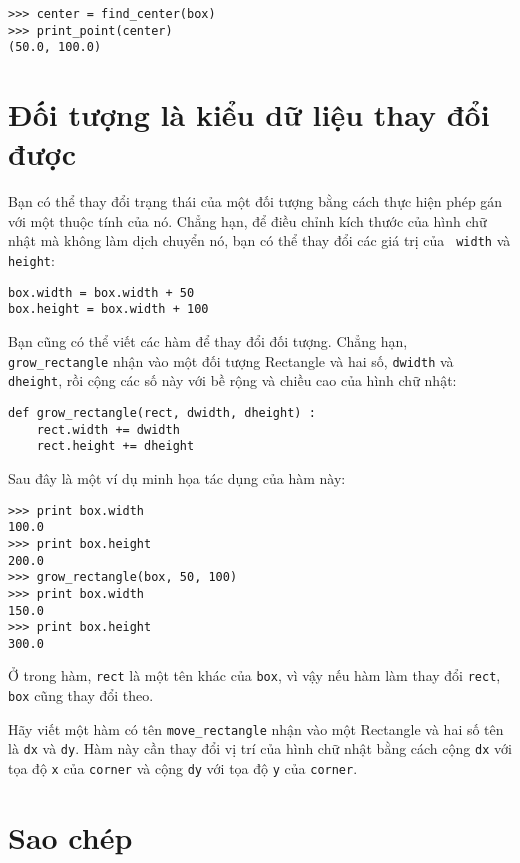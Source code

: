 \documentclass[11pt]{book}
\begin{document}
\beforeverb
\begin{verbatim}
>>> center = find_center(box)
>>> print_point(center)
(50.0, 100.0)
\end{verbatim}
\afterverb
%

\section{Đối tượng là kiểu dữ liệu thay đổi được}


Bạn có thể thay đổi trạng thái của một đối tượng bằng cách thực hiện phép gán 
với một thuộc tính của nó. Chẳng hạn, để điều chỉnh kích thước của hình chữ nhật
mà không làm dịch chuyển nó, bạn có thể thay đổi các giá trị của {\tt
width} và {\tt height}:

\beforeverb
\begin{verbatim}
box.width = box.width + 50
box.height = box.width + 100
\end{verbatim}
\afterverb
%
Bạn cũng có thể viết các hàm để thay đổi đối tượng. Chẳng hạn,
\verb"grow_rectangle" nhận vào một đối tượng Rectangle và hai số,
{\tt dwidth} và {\tt dheight}, rồi cộng các số này với bề rộng và chiều cao 
của hình chữ nhật:

\beforeverb
\begin{verbatim}
def grow_rectangle(rect, dwidth, dheight) :
    rect.width += dwidth
    rect.height += dheight
\end{verbatim}
\afterverb
%
Sau đây là một ví dụ minh họa tác dụng của hàm này:

\beforeverb
\begin{verbatim}
>>> print box.width
100.0
>>> print box.height
200.0
>>> grow_rectangle(box, 50, 100)
>>> print box.width
150.0
>>> print box.height
300.0
\end{verbatim}
\afterverb
%
Ở trong hàm, {\tt rect} là một tên khác
của {\tt box}, vì vậy nếu hàm làm thay đổi {\tt rect}, 
{\tt box} cũng thay đổi theo.

\begin{ex}
Hãy viết một hàm có tên \verb"move_rectangle" nhận vào một
Rectangle và hai số tên là {\tt dx} và {\tt dy}.  Hàm này
cần thay đổi vị trí của hình chữ nhật bằng cách cộng {\tt dx}
với tọa độ {\tt x} của {\tt corner} và cộng {\tt dy}
với tọa độ {\tt y} của {\tt corner}.
\end{ex}


\section{Sao chép}
\end{document}
